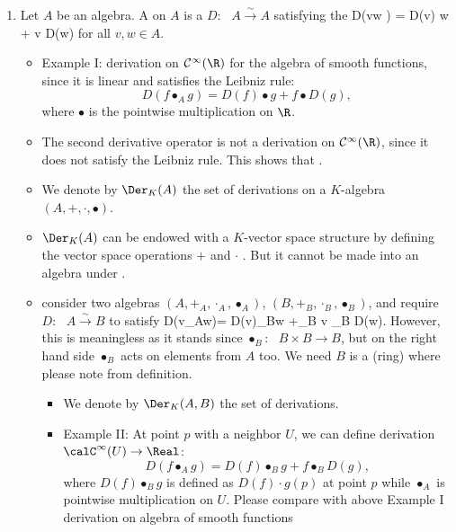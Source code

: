\documentclass{article}
\newcommand{\cl}{:\text{ }}
\begin{document}
\begin{enumerate}
\item {}
Let $A$ be an algebra. A  on $A$ is a  $D\cl A \xrightarrow{\sim}A$ satisfying the 
\bse
D(v\bullet w ) = D(v) \bullet w + v \bullet D(w)
\ese
for all $v,w \in A$.
\begin{itemize}
\item Example I: derivation on $\mathcal{C}^\infty(\R)$ for the algebra of smooth  functions, since it is linear and satisfies the Leibniz rule:
$$D(f\bullet_A g)= D(f)\bullet g + f \bullet D(g),$$
where $\bullet$ is the pointwise multiplication on $\R$.
\item The second derivative operator is not a derivation on $\mathcal{C}^\infty(\R)$, since it does not satisfy the Leibniz rule. This shows that .
\item {} We denote by $\Der_K(A)$ the set of derivations on a $K$-algebra $(A,+,\cdot,\bullet)$. 
\item $\Der_K(A)$ can be endowed with a $K$-vector space structure by defining the vector space operations $+$ and $\cdot$ . But it cannot be made into an algebra under .
    \item {} consider two algebras $(A,+_A,\cdot_A,\bullet_A)$, $(B,+_B,\cdot_B,\bullet_B)$, and require $D\cl A\xrightarrow{\sim}B$ to satisfy
\bse
D(v\bullet_Aw)= D(v)\bullet_Bw +_B v \bullet_B D(w).
\ese
However, this is meaningless as it stands since $\bullet_B\cl B\times B \to B$, but on the right hand side $\bullet_B$ acts on elements from $A$ too. We need $B$ is a (ring)  where please note  from definition. 
\begin{itemize}[$\ast$]
\item {} We denote by $\Der_K(A, B)$ the set of derivations.
    \item Example II: At point $p$ with a neighbor $U$, we can define derivation $\calC^\infty(U)\to\Real$: 
    $$D(f\bullet_A g)= D(f)\bullet_B g + f \bullet_B D(g),$$
    where $D(f)\bullet_B g$ is defined as  $D(f)\cdot g(p)$ at point $p$ while $\bullet_A$ is pointwise multiplication on $U$. Please compare with above Example I derivation on algebra of smooth  functions
\end{itemize}
\end{itemize}


\end{enumerate}
\end{document}
